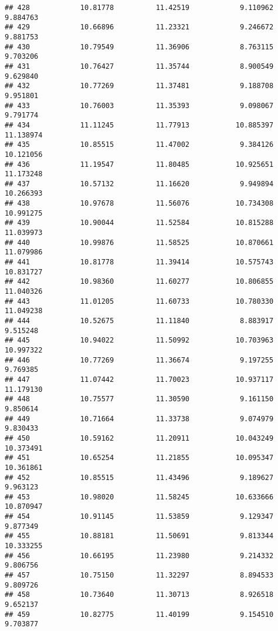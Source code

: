 \documentclass[
]{article}
\begin{document}
\begin{verbatim}
## 428            10.81778          11.42519            9.110962          9.884763
## 429            10.66896          11.23321            9.246672          9.881753
## 430            10.79549          11.36906            8.763115          9.703206
## 431            10.76427          11.35744            8.900549          9.629840
## 432            10.77269          11.37481            9.188708          9.951801
## 433            10.76003          11.35393            9.098067          9.791774
## 434            11.11245          11.77913           10.885397         11.138974
## 435            10.85515          11.47002            9.384126         10.121056
## 436            11.19547          11.80485           10.925651         11.173248
## 437            10.57132          11.16620            9.949894         10.266393
## 438            10.97678          11.56076           10.734308         10.991275
## 439            10.90044          11.52584           10.815288         11.039973
## 440            10.99876          11.58525           10.870661         11.079986
## 441            10.81778          11.39414           10.575743         10.831727
## 442            10.98360          11.60277           10.806855         11.040326
## 443            11.01205          11.60733           10.780330         11.049238
## 444            10.52675          11.11840            8.883917          9.515248
## 445            10.94022          11.50992           10.703963         10.997322
## 446            10.77269          11.36674            9.197255          9.769385
## 447            11.07442          11.70023           10.937117         11.179130
## 448            10.75577          11.30590            9.161150          9.850614
## 449            10.71664          11.33738            9.074979          9.830433
## 450            10.59162          11.20911           10.043249         10.373491
## 451            10.65254          11.21855           10.095347         10.361861
## 452            10.85515          11.43496            9.189627          9.963123
## 453            10.98020          11.58245           10.633666         10.870947
## 454            10.91145          11.53859            9.129347          9.877349
## 455            10.88181          11.50691            9.813344         10.333255
## 456            10.66195          11.23980            9.214332          9.806756
## 457            10.75150          11.32297            8.894533          9.809726
## 458            10.73640          11.30713            8.926518          9.652137
## 459            10.82775          11.40199            9.154510          9.703877

\end{verbatim}
\end{document}
